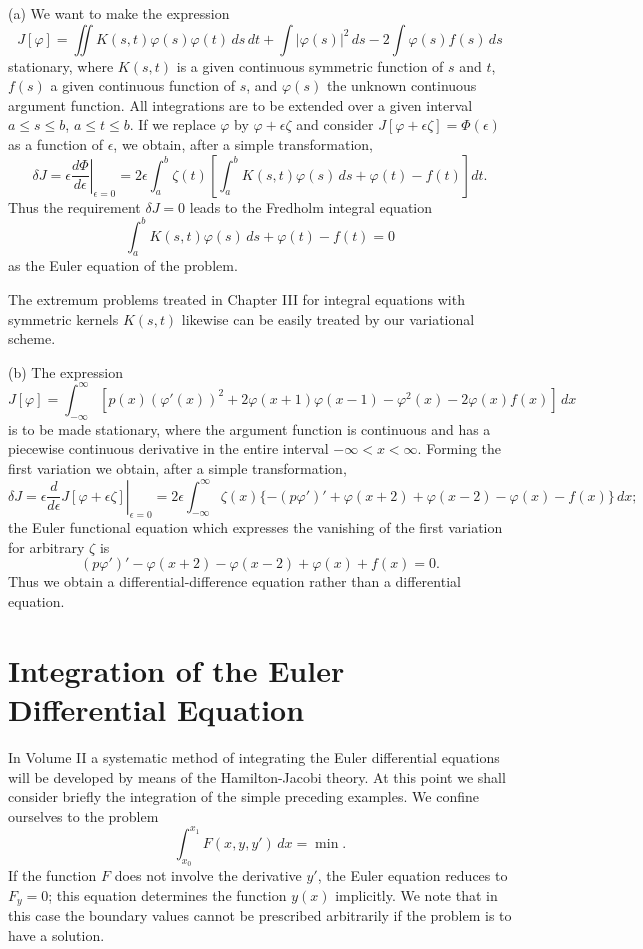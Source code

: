 (a) We want to make the expression
\[
J[\varphi]=\iint K(s,t)\varphi(s)\varphi(t)\,ds\,dt
+\int|\varphi(s)|^2\,ds-2\int\varphi(s)f(s)\,ds
\]
stationary, where $K(s,t)$ is a given continuous symmetric function of $s$ and $t$, $f(s)$ a given continuous function of $s$, and $\varphi(s)$ the unknown continuous argument function. All integrations are to be extended over a given interval $a\le s\le b$, $a\le t\le b$. If we replace $\varphi$ by $\varphi+\epsilon\zeta$ and consider $J[\varphi+\epsilon\zeta]=\Phi(\epsilon)$ as a function of $\epsilon$, we obtain, after a simple transformation,
\[
\delta J=\left.\epsilon\frac{d\Phi}{d\epsilon}\right|_{\epsilon=0}
=2\epsilon\int_a^b\zeta(t)\left[\int_a^bK(s,t)\varphi(s)\,ds+\varphi(t)-f(t)\right]dt.
\]
Thus the requirement $\delta J=0$ leads to the Fredholm integral equation
\[
\int_a^bK(s,t)\varphi(s)\,ds+\varphi(t)-f(t)=0
\]
as the Euler equation of the problem.

The extremum problems treated in Chapter III for integral equations with symmetric kernels $K(s,t)$ likewise can be easily treated by our variational scheme.

(b) The expression
\[
J[\varphi]=\int_{-\infty}^{\infty}
[p(x)(\varphi'(x))^2+2\varphi(x+1)\varphi(x-1)-\varphi^2(x)-2\varphi(x)f(x)]\,dx
\]
is to be made stationary, where the argument function is continuous and has a piecewise continuous derivative in the entire interval $-\infty<x<\infty$. Forming the first variation we obtain, after a simple transformation,
\[
\delta J=\left.\epsilon\frac{d}{d\epsilon}J[\varphi+\epsilon\zeta]\right|_{\epsilon=0}
=2\epsilon\int_{-\infty}^{\infty}\zeta(x)
\{- (p\varphi')'+\varphi(x+2)+\varphi(x-2)-\varphi(x)-f(x)\}\,dx;
\]
the Euler functional equation which expresses the vanishing of the first variation for arbitrary $\zeta$ is
\[
(p\varphi')'-\varphi(x+2)-\varphi(x-2)+\varphi(x)+f(x)=0.
\]
Thus we obtain a differential-difference equation rather than a differential equation.

\section{Integration of the Euler Differential Equation}
In Volume II a systematic method of integrating the Euler differential equations will be developed by means of the Hamilton-Jacobi theory. At this point we shall consider briefly the integration of the simple preceding examples. We confine ourselves to the problem
\[
\int_{x_0}^{x_1}F(x,y,y')\,dx=\min.
\]
If the function $F$ does not involve the derivative $y'$, the Euler equation reduces to $F_y=0$; this equation determines the function $y(x)$ implicitly. We note that in this case the boundary values cannot be prescribed arbitrarily if the problem is to have a solution.

